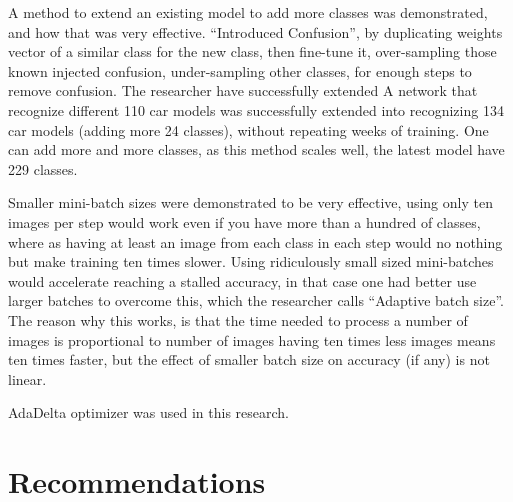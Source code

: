 A method to extend an existing model to add more classes was demonstrated,
and how that was very effective. ``Introduced Confusion'',
by duplicating weights vector of a similar class for the new class,
then fine-tune it, over-sampling those known injected confusion, under-sampling other classes,
for enough steps to remove confusion.
The researcher have successfully extended
A network that recognize different 110 car models was successfully extended 
into recognizing 134 car models (adding more 24 classes), without repeating weeks of training.
One can add more and more classes, as this method scales well, the latest model have 229 classes.

Smaller mini-batch sizes were demonstrated to be very effective,
using only ten images per step would work even if you have more than a hundred of classes,
where as having at least an image from each class in each step would no nothing but make training ten times slower.
Using ridiculously small sized mini-batches would accelerate reaching a stalled accuracy, in that case one had better
use larger batches to overcome this, which the researcher calls ``Adaptive batch size''.
The reason why this works, is that the time needed to process a number of images is proportional to number of images
having ten times less images means ten times faster,
but the effect of smaller batch size on accuracy (if any) is not linear.

AdaDelta\autocite{zeiler2012adadelta} optimizer was used in this research. 

\section{Recommendations}

